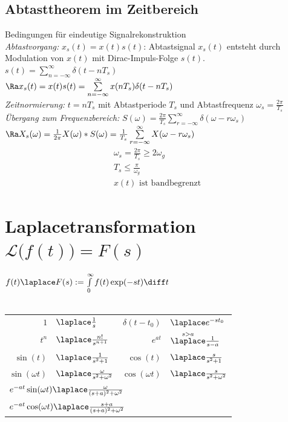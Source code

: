 \documentclass[6pt,a4paper]{scrartcl}
\begin{document}
\begin{multicols}{4}
	\subsection{Abtasttheorem im Zeitbereich}
	Bedingungen für eindeutige Signalrekonstruktion\\
	\emph{Abtastvorgang:} \underline{$x_s(t) = x(t) s(t)$}: Abtastsignal $x_s(t)$ entsteht durch Modulation von $x(t)$ mit Dirac-Impuls-Folge $s(t)$.\\
	$s(t) = \sum\limits_{n=-\infty}^{\infty}{\delta(t - n T_s)}$\\
	$\Ra x_s(t) = x(t) s(t) = \sum\limits_{n=-\infty}^{\infty}{x(n T_s) \delta(t - n T_s)}$\\
	\emph{Zeitnormierung:} $t = n T_s$ mit Abtastperiode $T_s$ und Abtastfrequenz $\omega_s = \frac{2 \pi}{T_s}$\\
	\emph{Übergang zum Frequenzbereich:} $S(\omega) = \frac{2 \pi}{T_s} \sum\limits_{r=-\infty}^{\infty}{\delta(\omega
	 - r \omega_s)}$\\
	$\Ra X_s(\omega) = \frac{1}{2 \pi} X(\omega) \ast S(\omega) = \frac{1}{T_s} \sum\limits_{r=-\infty}^{\infty}{X(\omega - r \omega_s)}$
	\begin{align}
		\omega_s = \frac{2 \pi}{T_s} \geq 2 \omega_g\\
		T_s \leq \frac{\pi}{\omega_g}\\
		x(t) \text{ ist bandbegrenzt}
	\end{align}

\section{Laplacetransformation \quad $\mathcal L\bigl(f(t)\bigr) = F(s)$}
	$f(t) \laplace F(s) := \int\limits_0^\infty f(t) \exp(-st) \diff t$\\
	\\
	\everymath{\displaystyle}	%
	\begin{tabular}{rl|rl}
		$1$ & \!\!\!\!\!\!\!\!\!\!$\laplace \frac{1}{s}$ & $\delta(t-t_0)$ & \!\!\!\!\!\!\!\!\!\!$\laplace e^{-s t_0}$\\[0.2em]
		$t^n$ & \!\!\!\!\!\!\!\!\!\!$\laplace \frac{n!}{s^{n+1}}$ & $e^{at}$  & \!\!\!\!\!\!\!\!\!\!$\overset{s > a}{ \laplace } \frac{1}{s-a}$\\[0.5em] 
		$\sin(t)$ & \!\!\!\!\!\!\!\!\!\!$\laplace \frac{1}{s^2 + 1}$ & $\cos(t)$ & \!\!\!\!\!\!\!\!\!\!$\laplace \frac{s}{s^2 + 1}$\\[0.5em]
		$\sin(\omega t)$ & \!\!\!\!\!\!\!\!\!\!$\laplace \frac{\omega}{s^2 + \omega^2}$ & $\cos(\omega t)$ & \!\!\!\!\!\!\!\!\!\!$\laplace \frac{s}{s^2 + \omega^2}$\\[0.5em]
		\multicolumn{4}{l}{ $e^{-at} \sin(\omega t) \laplace \frac{\omega}{(s+a)^2+\omega^2}$} \\
		\multicolumn{4}{l}{ $e^{-at} \cos(\omega t) \laplace \frac{s+a}{(s+a)^2+\omega^2}$}\\ 		


\end{tabular}
\end{multicols}
\end{document}
